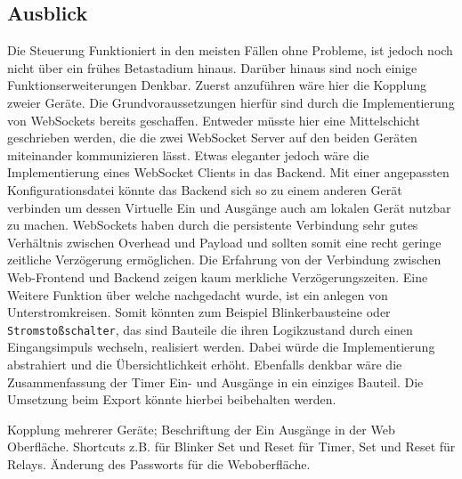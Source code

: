  \subsection{Ausblick}
 Die Steuerung Funktioniert in den meisten Fällen ohne Probleme, ist jedoch noch nicht über ein frühes Betastadium hinaus. Darüber hinaus sind noch einige Funktionserweiterungen Denkbar. Zuerst anzuführen wäre hier die Kopplung zweier Geräte. Die Grundvoraussetzungen hierfür sind durch die Implementierung  von WebSockets bereits geschaffen. Entweder müsste hier eine Mittelschicht geschrieben werden, die die zwei WebSocket Server auf den beiden Geräten miteinander kommunizieren lässt. Etwas eleganter jedoch wäre die Implementierung eines WebSocket Clients in das Backend. Mit einer angepassten Konfigurationsdatei könnte das Backend sich so zu einem anderen Gerät verbinden um dessen Virtuelle Ein und Ausgänge auch am lokalen Gerät nutzbar zu machen. WebSockets haben durch die persistente Verbindung sehr gutes Verhältnis zwischen Overhead und Payload und sollten somit eine recht geringe zeitliche Verzögerung ermöglichen. Die Erfahrung von der Verbindung zwischen Web-Frontend und Backend zeigen kaum merkliche Verzögerungszeiten. Eine Weitere Funktion über welche nachgedacht wurde, ist ein anlegen von Unterstromkreisen. Somit könnten zum Beispiel Blinkerbausteine oder \texttt{Stromstoßschalter}, das sind Bauteile die ihren Logikzustand durch einen Eingangsimpuls wechseln, realisiert werden. Dabei würde die Implementierung abstrahiert und die Übersichtlichkeit erhöht. Ebenfalls denkbar wäre die Zusammenfassung der Timer Ein- und Ausgänge in ein einziges Bauteil. Die Umsetzung beim Export könnte hierbei beibehalten werden. 
  
 Kopplung mehrerer Geräte;
 Beschriftung der Ein Ausgänge in der Web Oberfläche. 
 Shortcuts z.B. für Blinker
 Set und Reset für Timer,
 Set und Reset für Relays.
 Änderung des Passworts für die Weboberfläche.
 
 
 
\clearpage